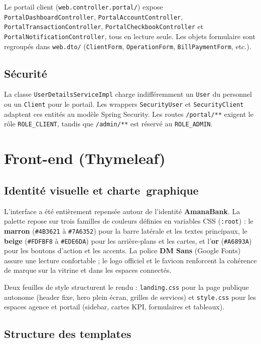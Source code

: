 \documentclass[11pt,a4paper,oneside]{report}
\begin{document}
Le portail client (\texttt{web.controller.portal/}) expose \texttt{PortalDashboardController}, \texttt{PortalAccountController}, \texttt{PortalTransactionController}, \texttt{PortalCheckbookController} et \texttt{PortalNotificationController}, tous en lecture seule. Les objets formulaire sont regroupés dans \texttt{web.dto/} (\texttt{ClientForm}, \texttt{OperationForm}, \texttt{BillPaymentForm}, etc.).

\subsection{Sécurité}

La classe \texttt{UserDetailsServiceImpl} charge indifféremment un \texttt{User} du personnel ou un \texttt{Client} pour le portail. Les wrappers \texttt{SecurityUser} et \texttt{SecurityClient} adaptent ces entités au modèle Spring Security. Les routes \texttt{/portal/**} exigent le rôle \texttt{ROLE\_CLIENT}, tandis que \texttt{/admin/**} est réservé au \texttt{ROLE\_ADMIN}.

\section{Front-end (Thymeleaf)}

\subsection{Identité visuelle et charte~graphique}

L'interface a été entièrement repensée autour de l'identité \textbf{AmanaBank}. La palette repose sur trois familles de couleurs définies en variables CSS (\texttt{:root}) : le \textbf{marron} (\texttt{\#4B3621} à \texttt{\#7A6352}) pour la barre latérale et les textes principaux, le \textbf{beige} (\texttt{\#FDFBF8} à \texttt{\#EDE6DA}) pour les arrière-plans et les cartes, et l'\textbf{or} (\texttt{\#A6893A}) pour les boutons d'action et les accents. La police \textbf{DM Sans} (Google Fonts) assure une lecture confortable ; le logo officiel et le favicon renforcent la cohérence de marque sur la vitrine et dans les espaces connectés.

Deux feuilles de style structurent le rendu : \texttt{landing.css} pour la page publique autonome (header fixe, hero plein écran, grilles de services) et \texttt{style.css} pour les espaces agence et portail (sidebar, cartes KPI, formulaires et tableaux).

\subsection{Structure des templates}
\end{document}
